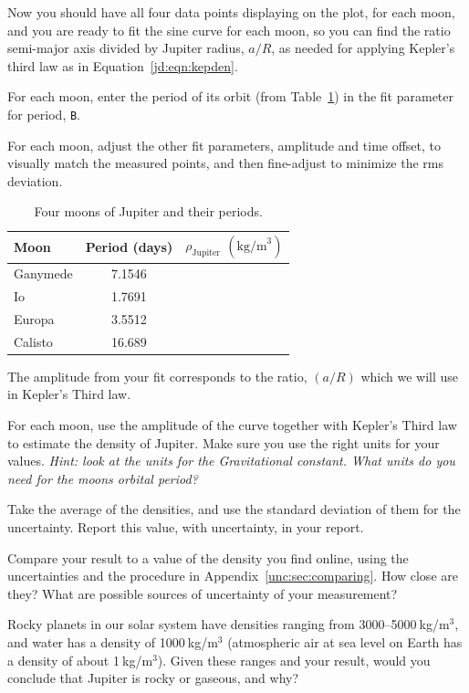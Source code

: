 Now you should have all four data points displaying on the plot, for each moon, and you are ready to fit the sine curve for each moon, so you can find the ratio semi-major axis divided by Jupiter radius, $a/R$, as needed for applying Kepler's third law as in Equation\ \ref{jd:eqn:kepden}.

\begin{steps}
	\item For each moon, enter the period of its orbit (from Table\ \ref{jd:tab:periods}) in the fit parameter for period, \texttt{B}.
	
	\item For each moon, adjust the other fit parameters, amplitude and time offset, to visually match the measured points, and then fine-adjust to minimize the rms deviation.
\end{steps}

\begin{table}
	\centering
	\begin{tabular}{ l c r }
		\hline
		Moon & Period (days) & $\rho_\textrm{Jupiter}$ $(\textrm{kg/m}^3)$\\
		\hline
		Ganymede & 7.1546 & \\
		Io & 1.7691 & \\
		Europa & 3.5512 & \\
		Calisto & 16.689 & \\
		\hline  
	\end{tabular}
	\caption{Four moons of Jupiter and their periods.}\label{jd:tab:periods}
\end{table}

The amplitude from your fit corresponds to the ratio, $(a/R)$ which we will use in Kepler’s Third law.

\begin{steps}
	\item For each moon, use the amplitude of the curve together with Kepler's Third law
	to estimate the density of Jupiter. Make sure you use the right units for your values. \textit{Hint:
	look at the units for the Gravitational constant. What units do you need for the moons
	orbital period?}

	\item\label{jd:step:density} Take the average of the densities, and use the standard deviation of them for the uncertainty. Report this value, with uncertainty, in your report.
	
	\item Compare your result to a value of the density you find online, using the uncertainties and the procedure in Appendix~\ref{unc:sec:comparing}. How close are they? What are possible sources of uncertainty of your measurement?
	
	\item\label{jd:step:composition} Rocky planets in our solar system have densities ranging from 3000--5000$\:$kg/m$^3$, and water has a density of 1000$\:$kg/m$^3$ (atmospheric air at sea level on Earth has a density of about 1$\:$kg/m$^3$). Given these ranges and your result, would you conclude that Jupiter is rocky or gaseous, and why?
\end{steps}


